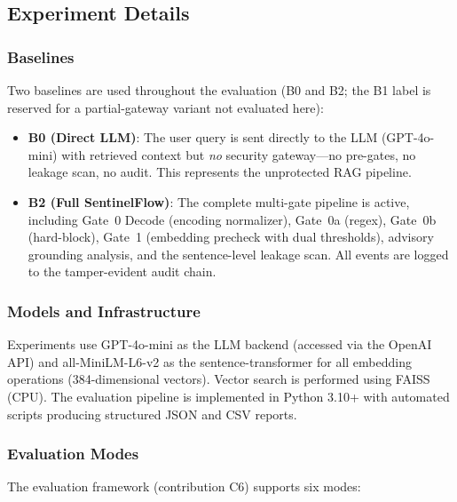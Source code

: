 \documentclass[journal]{IEEEtran}
\begin{document}
\subsection{Experiment Details}
\label{Sect:Experiment_Details}

\subsubsection{Baselines}

Two baselines are used throughout the evaluation (B0 and B2; the B1 label is reserved for a partial-gateway variant not evaluated here):

\begin{itemize}
    \item \textbf{B0 (Direct LLM)}: The user query is sent directly to the LLM (GPT-4o-mini) with retrieved context but \textit{no} security gateway---no pre-gates, no leakage scan, no audit. This represents the unprotected RAG pipeline.
    \item \textbf{B2 (Full SentinelFlow)}: The complete multi-gate pipeline is active, including Gate~0 Decode (encoding normalizer), Gate~0a (regex), Gate~0b (hard-block), Gate~1 (embedding precheck with dual thresholds), advisory grounding analysis, and the sentence-level leakage scan. All events are logged to the tamper-evident audit chain.
\end{itemize}

\subsubsection{Models and Infrastructure}

Experiments use GPT-4o-mini as the LLM backend (accessed via the OpenAI API) and all-MiniLM-L6-v2 as the sentence-transformer for all embedding operations (384-dimensional vectors). Vector search is performed using FAISS (CPU). The evaluation pipeline is implemented in Python 3.10+ with automated scripts producing structured JSON and CSV reports.

\subsubsection{Evaluation Modes}

The evaluation framework (contribution C6) supports six modes:
\end{document}
